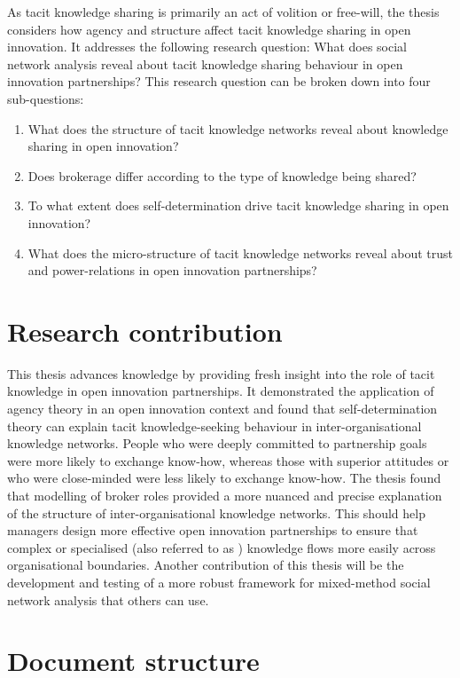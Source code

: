 As tacit knowledge sharing is primarily an act of volition or free-will, the thesis considers how agency and structure affect tacit knowledge sharing in open innovation. It addresses the following research question: What does social network analysis reveal about tacit knowledge sharing behaviour in open innovation partnerships? This research question can be broken down into four sub-questions:

\begin{enumerate}
\item What does the structure of tacit knowledge networks reveal about knowledge sharing in open innovation?
\item Does brokerage differ according to the type of knowledge being shared?
\item To what extent does self-determination drive tacit knowledge sharing in open innovation?
\item What does the micro-structure of tacit knowledge networks reveal about trust and power-relations in open innovation partnerships?
\end{enumerate}

\section{Research contribution}

This thesis advances knowledge by providing fresh insight into the role of tacit knowledge in open innovation partnerships. It demonstrated the application of agency theory in an open innovation context and found that self-determination theory can explain tacit knowledge-seeking behaviour in inter-organisational knowledge networks. People who were deeply committed to partnership goals were more likely to exchange know-how, whereas those with superior attitudes or who were close-minded were less likely to exchange know-how. The thesis found that modelling of broker roles provided a more nuanced and precise explanation of the structure of inter-organisational knowledge networks. This should help managers design more effective open innovation partnerships to ensure that complex or specialised (also referred to as ) knowledge flows more easily across organisational boundaries. Another contribution of this thesis will be the development and testing of a more robust framework for mixed-method social network analysis that others can use. 

\section{Document structure}

